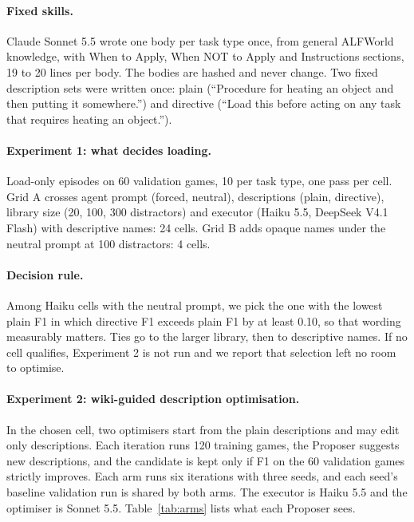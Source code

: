 \documentclass[11pt]{article}
\begin{document}
\paragraph{Fixed skills.} Claude Sonnet 5.5 wrote one body per task type once, from general ALFWorld knowledge, with When to Apply, When NOT to Apply and Instructions sections, 19 to 20 lines per body. The bodies are hashed and never change. Two fixed description sets were written once: plain (``Procedure for heating an object and then putting it somewhere.'') and directive (``Load this before acting on any task that requires heating an object.'').

\paragraph{Experiment 1: what decides loading.} Load-only episodes on 60 validation games, 10 per task type, one pass per cell. Grid A crosses agent prompt (forced, neutral), descriptions (plain, directive), library size (20, 100, 300 distractors) and executor (Haiku 5.5, DeepSeek V4.1 Flash) with descriptive names: 24 cells. Grid B adds opaque names under the neutral prompt at 100 distractors: 4 cells.

\paragraph{Decision rule.} Among Haiku cells with the neutral prompt, we pick the one with the lowest plain F1 in which directive F1 exceeds plain F1 by at least 0.10, so that wording measurably matters. Ties go to the larger library, then to descriptive names. If no cell qualifies, Experiment 2 is not run and we report that selection left no room to optimise.

\paragraph{Experiment 2: wiki-guided description optimisation.} In the chosen cell, two optimisers start from the plain descriptions and may edit only descriptions. Each iteration runs 120 training games, the Proposer suggests new descriptions, and the candidate is kept only if F1 on the 60 validation games strictly improves. Each arm runs six iterations with three seeds, and each seed's baseline validation run is shared by both arms. The executor is Haiku 5.5 and the optimiser is Sonnet 5.5. Table~\ref{tab:arms} lists what each Proposer sees.
\end{document}
